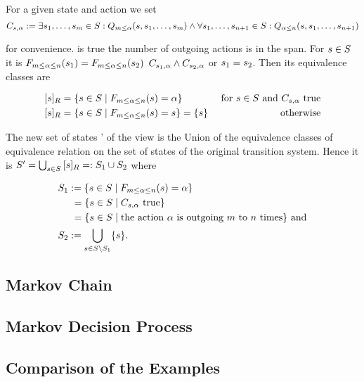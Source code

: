 \documentclass[preview]{standalone}
\begin{document}
For a given state \state and action \action we set
\[
\formoutact:= \exists \state_1, \dots, \state_\numoutactb \in \states: \predminoutact[\numoutactb]\land \\
\forall \state_1, \dots, \state_{\numoutact+1} \in \states: \predmaxoutact
\]

for convenience. \formoutact is true  \iffN the number of outgoing actions is in the span. For $\state \in \states$ it is $\gfctspanoutaction(\state_1) = \gfctspanoutaction(\state_2)$ \iffN $\formoutact[\state_1] \land \formoutact[\state_2]$ or $\state_1 = \state_2$. Then its equivalence classes are

\begin{align*}
	\eqclassv{\state} &= \{\state \in \states \mid \gfctspanoutaction(\state) = \action\} &\text{ for } \state \in \states \text{ and } \formoutact \text{ true} \\
	\eqclassv{\state} &= \{\state \in \states \mid \gfctspanoutaction(\state) = \state\} = \{\state\} &\text{ otherwise}	
\end{align*}

The new set of states \states' of the view \viewspanoutaction is the Union of the equivalence classes of equivalence relation \eqrelview on the set of states \states of the original transition system. Hence it is $\states' = \bigcup_{\state \in \states} \eqclassv{\state} =: \states_1 \cup \states_2$ where

\begin{align*}
	\states_1 &:= \{\state \in \states \mid \gfctspanoutaction(\state) = \action\} \\
	&\hspace{1.15mm}= \{\state \in \states  \mid \formoutact \text{ true}\} \\
	&\hspace{1.15mm}= \{\state \in \states \mid \text{the action } \action \text{ is outgoing } \numoutactb \text{ to } \numoutact \text{ times}\} \text{ and} \\
	\states_2 &:= \bigcup_{\state \in \states \setminus \states_1}\{\state\}.
\end{align*}

\subsection{Markov Chain}
\subsection{Markov Decision Process}
\subsection{Comparison of the Examples}
\end{document}
